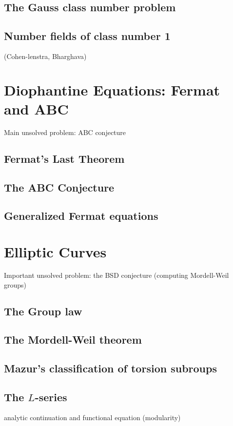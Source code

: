 \documentclass{book}
\begin{document}
\section{The Gauss class number problem}
\section{Number fields of class number 1}
 (Cohen-lenstra, Bharghava)



\chapter{Diophantine Equations: Fermat and ABC}
Main unsolved problem: ABC conjecture

\section{Fermat's Last Theorem}
\section{The ABC Conjecture}
\section{Generalized Fermat equations}



\chapter{Elliptic Curves}
Important unsolved problem: the BSD conjecture (computing Mordell-Weil groups)

\section{The Group law}
\section{The Mordell-Weil theorem}
\section{Mazur's classification of torsion subroups}
\section{The $L$-series}
analytic continuation and functional equation (modularity)
\end{document}

